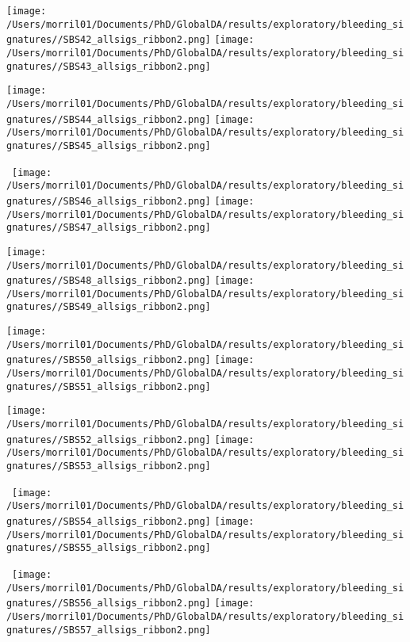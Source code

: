\documentclass{article}
\begin{document}
\hspace{-1in}\texttt{[image: /Users/morril01/Documents/PhD/GlobalDA/results/exploratory/bleeding\_signatures//SBS42\_allsigs\_ribbon2.png]}  \texttt{[image: /Users/morril01/Documents/PhD/GlobalDA/results/exploratory/bleeding\_signatures//SBS43\_allsigs\_ribbon2.png]} 

\hspace{-1in}\texttt{[image: /Users/morril01/Documents/PhD/GlobalDA/results/exploratory/bleeding\_signatures//SBS44\_allsigs\_ribbon2.png]}   \texttt{[image: /Users/morril01/Documents/PhD/GlobalDA/results/exploratory/bleeding\_signatures//SBS45\_allsigs\_ribbon2.png]} 
 
\hspace{-1in}\ \texttt{[image: /Users/morril01/Documents/PhD/GlobalDA/results/exploratory/bleeding\_signatures//SBS46\_allsigs\_ribbon2.png]} \texttt{[image: /Users/morril01/Documents/PhD/GlobalDA/results/exploratory/bleeding\_signatures//SBS47\_allsigs\_ribbon2.png]} 
 
 \hspace{-1in}\texttt{[image: /Users/morril01/Documents/PhD/GlobalDA/results/exploratory/bleeding\_signatures//SBS48\_allsigs\_ribbon2.png]} \texttt{[image: /Users/morril01/Documents/PhD/GlobalDA/results/exploratory/bleeding\_signatures//SBS49\_allsigs\_ribbon2.png]} 
 
 \hspace{-1in}\texttt{[image: /Users/morril01/Documents/PhD/GlobalDA/results/exploratory/bleeding\_signatures//SBS50\_allsigs\_ribbon2.png]} \texttt{[image: /Users/morril01/Documents/PhD/GlobalDA/results/exploratory/bleeding\_signatures//SBS51\_allsigs\_ribbon2.png]} 
 
 \hspace{-1in}\texttt{[image: /Users/morril01/Documents/PhD/GlobalDA/results/exploratory/bleeding\_signatures//SBS52\_allsigs\_ribbon2.png]} \texttt{[image: /Users/morril01/Documents/PhD/GlobalDA/results/exploratory/bleeding\_signatures//SBS53\_allsigs\_ribbon2.png]} 
 
\hspace{-1in}\ \texttt{[image: /Users/morril01/Documents/PhD/GlobalDA/results/exploratory/bleeding\_signatures//SBS54\_allsigs\_ribbon2.png]} \texttt{[image: /Users/morril01/Documents/PhD/GlobalDA/results/exploratory/bleeding\_signatures//SBS55\_allsigs\_ribbon2.png]}

\hspace{-1in}\ \texttt{[image: /Users/morril01/Documents/PhD/GlobalDA/results/exploratory/bleeding\_signatures//SBS56\_allsigs\_ribbon2.png]} \texttt{[image: /Users/morril01/Documents/PhD/GlobalDA/results/exploratory/bleeding\_signatures//SBS57\_allsigs\_ribbon2.png]}
\end{document}
